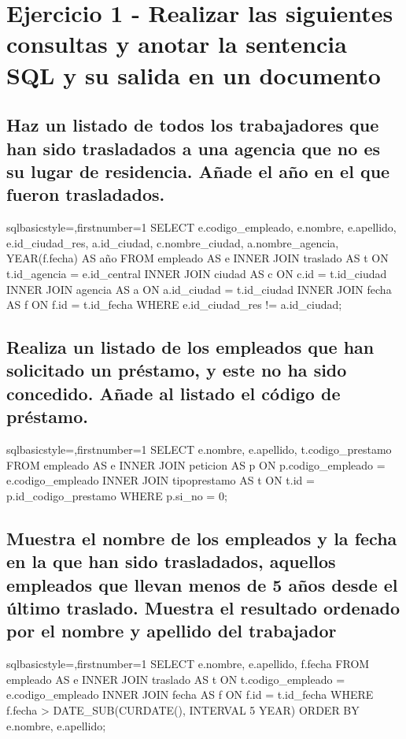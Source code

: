 \section{Ejercicio 1 - Realizar las siguientes consultas y anotar la sentencia SQL y su salida en un documento}
	\subsection{Haz un listado de todos los trabajadores que han sido trasladados a una agencia que no es su lugar de residencia. Añade el año en el que fueron trasladados.}
		\begin{sourcecodep}[]{sql}{basicstyle={\fontsize{10}{10}\selectfont\ttfamily},firstnumber=1}{}
			SELECT e.codigo_empleado, e.nombre, e.apellido, e.id_ciudad_res, a.id_ciudad, c.nombre_ciudad, a.nombre_agencia, YEAR(f.fecha) AS año FROM empleado AS e
				INNER JOIN traslado AS t ON t.id_agencia = e.id_central
				INNER JOIN ciudad AS c ON c.id = t.id_ciudad
				INNER JOIN agencia AS a ON a.id_ciudad = t.id_ciudad
				INNER JOIN fecha AS f ON f.id = t.id_fecha
				WHERE e.id_ciudad_res != a.id_ciudad;\end{sourcecodep}
	\subsection{Realiza un listado de los empleados que han solicitado un préstamo, y este no ha sido concedido. Añade al listado el código de préstamo.}
		\begin{sourcecodep}[]{sql}{basicstyle={\fontsize{10}{10}\selectfont\ttfamily},firstnumber=1}{}
			SELECT e.nombre, e.apellido, t.codigo_prestamo FROM empleado AS e
				INNER JOIN peticion AS p ON p.codigo_empleado = e.codigo_empleado
				INNER JOIN tipoprestamo AS t ON t.id = p.id_codigo_prestamo
				WHERE p.si_no = 0;\end{sourcecodep}
	\subsection{Muestra el nombre de los empleados y la fecha en la que han sido trasladados, aquellos empleados que llevan menos de 5 años desde el último traslado. Muestra el resultado ordenado por el nombre y apellido del trabajador}
		\begin{sourcecodep}[]{sql}{basicstyle={\fontsize{10}{10}\selectfont\ttfamily},firstnumber=1}{}
			SELECT e.nombre, e.apellido, f.fecha FROM empleado AS e
				INNER JOIN traslado AS t ON t.codigo_empleado = e.codigo_empleado
				INNER JOIN fecha AS f ON f.id = t.id_fecha
				WHERE f.fecha > DATE_SUB(CURDATE(), INTERVAL 5 YEAR)
				ORDER BY e.nombre, e.apellido;\end{sourcecodep}
\newpage
